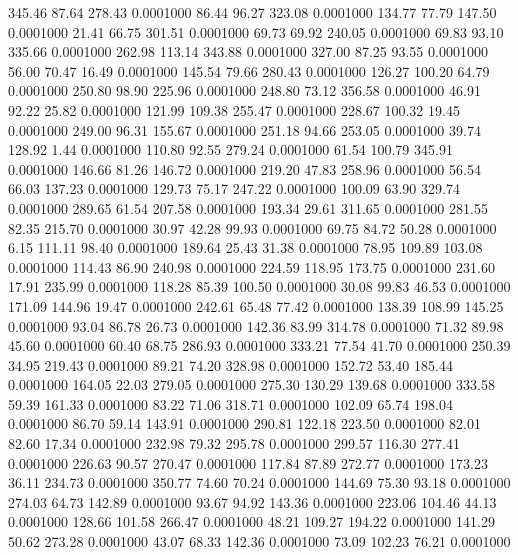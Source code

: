  345.46   87.64  278.43   0.0001000
  86.44   96.27  323.08   0.0001000
 134.77   77.79  147.50   0.0001000
  21.41   66.75  301.51   0.0001000
  69.73   69.92  240.05   0.0001000
  69.83   93.10  335.66   0.0001000
 262.98  113.14  343.88   0.0001000
 327.00   87.25   93.55   0.0001000
  56.00   70.47   16.49   0.0001000
 145.54   79.66  280.43   0.0001000
 126.27  100.20   64.79   0.0001000
 250.80   98.90  225.96   0.0001000
 248.80   73.12  356.58   0.0001000
  46.91   92.22   25.82   0.0001000
 121.99  109.38  255.47   0.0001000
 228.67  100.32   19.45   0.0001000
 249.00   96.31  155.67   0.0001000
 251.18   94.66  253.05   0.0001000
  39.74  128.92    1.44   0.0001000
 110.80   92.55  279.24   0.0001000
  61.54  100.79  345.91   0.0001000
 146.66   81.26  146.72   0.0001000
 219.20   47.83  258.96   0.0001000
  56.54   66.03  137.23   0.0001000
 129.73   75.17  247.22   0.0001000
 100.09   63.90  329.74   0.0001000
 289.65   61.54  207.58   0.0001000
 193.34   29.61  311.65   0.0001000
 281.55   82.35  215.70   0.0001000
  30.97   42.28   99.93   0.0001000
  69.75   84.72   50.28   0.0001000
   6.15  111.11   98.40   0.0001000
 189.64   25.43   31.38   0.0001000
  78.95  109.89  103.08   0.0001000
 114.43   86.90  240.98   0.0001000
 224.59  118.95  173.75   0.0001000
 231.60   17.91  235.99   0.0001000
 118.28   85.39  100.50   0.0001000
  30.08   99.83   46.53   0.0001000
 171.09  144.96   19.47   0.0001000
 242.61   65.48   77.42   0.0001000
 138.39  108.99  145.25   0.0001000
  93.04   86.78   26.73   0.0001000
 142.36   83.99  314.78   0.0001000
  71.32   89.98   45.60   0.0001000
  60.40   68.75  286.93   0.0001000
 333.21   77.54   41.70   0.0001000
 250.39   34.95  219.43   0.0001000
  89.21   74.20  328.98   0.0001000
 152.72   53.40  185.44   0.0001000
 164.05   22.03  279.05   0.0001000
 275.30  130.29  139.68   0.0001000
 333.58   59.39  161.33   0.0001000
  83.22   71.06  318.71   0.0001000
 102.09   65.74  198.04   0.0001000
  86.70   59.14  143.91   0.0001000
 290.81  122.18  223.50   0.0001000
  82.01   82.60   17.34   0.0001000
 232.98   79.32  295.78   0.0001000
 299.57  116.30  277.41   0.0001000
 226.63   90.57  270.47   0.0001000
 117.84   87.89  272.77   0.0001000
 173.23   36.11  234.73   0.0001000
 350.77   74.60   70.24   0.0001000
 144.69   75.30   93.18   0.0001000
 274.03   64.73  142.89   0.0001000
  93.67   94.92  143.36   0.0001000
 223.06  104.46   44.13   0.0001000
 128.66  101.58  266.47   0.0001000
  48.21  109.27  194.22   0.0001000
 141.29   50.62  273.28   0.0001000
  43.07   68.33  142.36   0.0001000
  73.09  102.23   76.21   0.0001000
